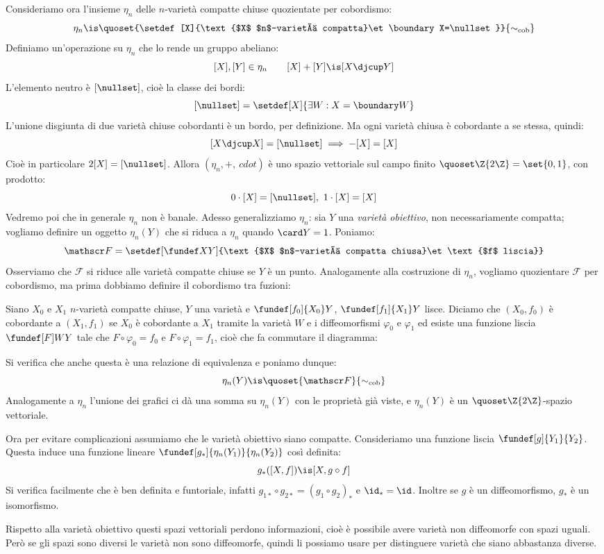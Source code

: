 Consideriamo ora l'insieme $\eta_n$ delle $n$-varietà compatte chiuse quozientate per cobordismo:
\[\eta_n\is\quoset{\setdef[X]{\text{$X$ $n$-varietà compatta}\et\boundary X=\nullset}}{\sim_\text{cob}}\]
Definiamo un'operazione su $\eta_n$ che lo rende un gruppo abeliano:
\[[X],[Y]\in\eta_n\qquad[X]+[Y]\is[X\djcup Y]\]
L'elemento neutro è $[\nullset]$, cioè la classe dei bordi:
\[[\nullset]=\setdef[X]{\exists W:X=\boundary W}\]
L'unione disgiunta di due varietà chiuse cobordanti è un bordo, per definizione. Ma ogni varietà chiusa è cobordante a se stessa, quindi:
\[[X\djcup X]=[\nullset]\implies-[X]=[X]\]
Cioè in particolare $2[X]=[\nullset]$. Allora $(\eta_n,+,\	cdot)$ è uno spazio vettoriale sul campo finito $\quoset\Z{2\Z}=\set{0,1}$, con prodotto:
\[0\cdot[X]=[\nullset],\ 1\cdot[X]=[X]\]
Vedremo poi che in generale $\eta_n$ non è banale. Adesso generalizziamo $\eta_n$: sia $Y$ una \emph{varietà obiettivo}, non necessariamente compatta; vogliamo definire un oggetto $\eta_n(Y)$ che si riduca a $\eta_n$ quando $\card Y=1$. Poniamo:
\[\mathscr F=\setdef[\fundef XY]{\text{$X$ $n$-varietà compatta chiusa}\et\text{$f$ liscia}}\]
Osserviamo che $\mathscr F$ si riduce alle varietà compatte chiuse se $Y$ è un punto. Analogamente alla costruzione di $\eta_n$, vogliamo quozientare $\mathscr F$ per cobordismo, ma prima dobbiamo definire il cobordismo tra fuzioni:

\begin{defn}
	Siano $X_0$ e $X_1$ $n$-varietà compatte chiuse, $Y$ una varietà e $\fundef[f_0]{X_0}Y$, $\fundef[f_1]{X_1}Y$ lisce. Diciamo che $(X_0,f_0)$ è cobordante a $(X_1,f_1)$ se $X_0$ è cobordante a $X_1$ tramite la varietà $W$ e i diffeomorfismi $\varphi_0$ e $\varphi_1$ ed esiste una funzione liscia $\fundef[F]WY$ tale che $F\circ\varphi_0=f_0$ e $F\circ\varphi_1=f_1$, cioè che fa commutare il diagramma:
	\begin{center}
		
	\end{center}
\end{defn}

Si verifica che anche questa è una relazione di equivalenza e poniamo dunque:
\[\eta_n(Y)\is\quoset{\mathscr F}{\sim_\text{cob}}\]
Analogamente a $\eta_n$ l'unione dei grafici ci dà una somma su $\eta_n(Y)$ con le proprietà già viste, e $\eta_n(Y)$ è un $\quoset\Z{2\Z}$-spazio vettoriale.

Ora per evitare complicazioni assumiamo che le varietà obiettivo siano compatte. Consideriamo una funzione liscia $\fundef[g]{Y_1}{Y_2}$. Questa induce una funzione lineare $\fundef[g_*]{\eta_n(Y_1)}{\eta_n(Y_2)}$ così definita:
\[g_*([X,f])\is[X,g\circ f]\]
Si verifica facilmente che è ben definita e funtoriale, infatti $g_{1*}\circ g_{2*}=(g_1\circ g_2)_*$ e $\id_*=\id$. Inoltre se $g$ è un diffeomorfismo, $g_*$ è un isomorfismo.

Rispetto alla varietà obiettivo questi spazi vettoriali perdono informazioni, cioè è possibile avere varietà non diffeomorfe con spazi uguali. Però se gli spazi sono diversi le varietà non sono diffeomorfe, quindi li possiamo usare per distinguere varietà che siano abbastanza diverse.
